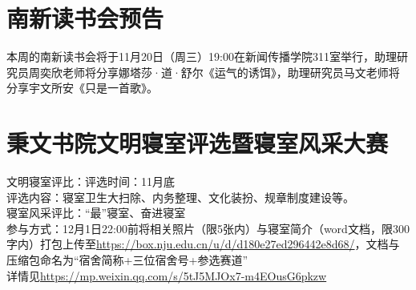 \documentclass[letterpaper, 12pt]{article}
\begin{document}
\begin{multicols}{2}
\section{南新读书会预告}
本周的南新读书会将于11月20日（周三）19:00在新闻传播学院311室举行，助理研究员周奕欣老师将分享娜塔莎·道·舒尔《运气的诱饵》，助理研究员马文老师将分享宇文所安《只是一首歌》。
\section{秉文书院文明寝室评选暨寝室风采大赛}
文明寝室评比：评选时间：11月底\\
评选内容：寝室卫生大扫除、内务整理、文化装扮、规章制度建设等。\\
寝室风采评比：“最”寝室、奋进寝室\\
参与方式：12月1日22:00前将相关照片（限5张内）与寝室简介（word文档，限300字内）打包上传至\url{https://box.nju.edu.cn/u/d/d180e27ed296442e8d68/}，文档与压缩包命名为“宿舍简称+三位宿舍号+参选赛道”\\
详情见\url{https://mp.weixin.qq.com/s/5tJ5MJOx7-m4EOusG6pkzw}

\end{multicols} 
\end{document}
